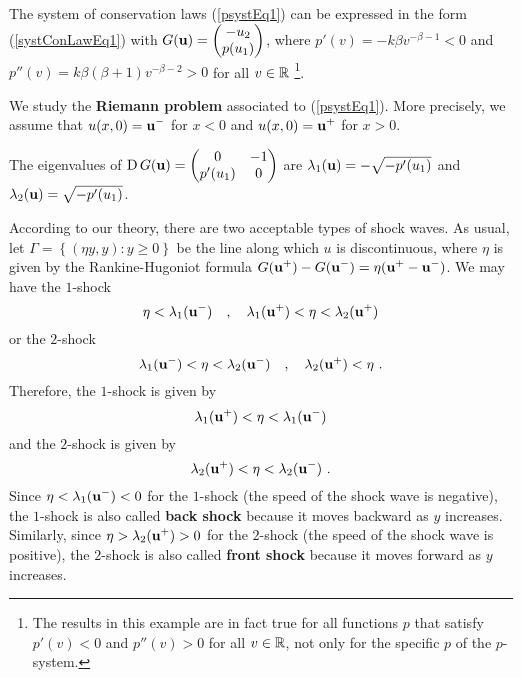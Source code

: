 \begin{egg}  \label{eggPsystem2}
The system of conservation laws (\ref{psystEq1}) can be expressed in
the form (\ref{systConLawEq1}) with
$\displaystyle G(\mathbf{u}) = \begin{pmatrix} -u_2 \\ p(u_1) \end{pmatrix}$,
where $p'(v) = -k\beta v^{-\beta-1} <0$ and
$p''(v) = k\beta(\beta+1) v^{-\beta-2} >0$ for all $v \in \mathbb{R}$
\footnote{The results in this example are in fact true for all
functions $p$ that satisfy $p'(v) < 0$ and $p''(v) > 0$ for all $v \in \mathbb{R}$,
not only for the specific $p$ of the $p$-system.}.

We study the {\bfseries Riemann problem} associated to (\ref{psystEq1}).  More
precisely, we assume that $\displaystyle u(x,0) = \mathbf{u}^-$ for $x<0$ and
$\displaystyle u(x,0) = \mathbf{u}^+$ for $x>0$.

The eigenvalues of
$\displaystyle \operatorname{D} G(\mathbf{u}) = \begin{pmatrix} 0 & -1 \\
p'(u_1) & 0 \end{pmatrix}$ are
$\lambda_1(\mathbf{u}) = -\sqrt{-p'(u_1)}$ and
$\lambda_2(\mathbf{u}) = \sqrt{-p'(u_1)}$.

According to our theory, there are two acceptable types of shock
waves.  As usual, let
$\displaystyle \Gamma = \left\{ (\eta y,y) : y \geq 0 \right\}$
be the line along which $u$ is discontinuous, where $\eta$ is given
by the Rankine-Hugoniot formula
$\displaystyle G(\mathbf{u}^+) - G(\mathbf{u}^-)
= \eta (\mathbf{u}^+ - \mathbf{u}^-)$.  We may have the $1$-shock
\[
\eta < \lambda_1(\mathbf{u}^-) \quad , \quad
\lambda_1(\mathbf{u}^+) <  \eta < \lambda_2(\mathbf{u}^+)
\]
or the $2$-shock
\[
\lambda_1(\mathbf{u}^-) <  \eta < \lambda_2(\mathbf{u}^-)
\quad , \quad \lambda_2(\mathbf{u}^+) <  \eta \ .
\]
Therefore, the $1$-shock is given by
\begin{equation} \label{psystEq2}
\lambda_1(\mathbf{u}^+) < \eta < \lambda_1(\mathbf{u}^-)
\end{equation}
and the $2$-shock is given by
\begin{equation} \label{psystEq3}
\lambda_2(\mathbf{u}^+) < \eta < \lambda_2(\mathbf{u}^-) \ .
\end{equation}
Since $\displaystyle \eta < \lambda_1(\mathbf{u}^-) < 0$ for the $1$-shock
(the speed of the shock wave is negative), the $1$-shock is also called
{\bfseries back shock}
because it moves backward as $y$ increases.
Similarly, since $\displaystyle \eta > \lambda_2(\mathbf{u}^+) > 0$ for the
$2$-shock (the speed of the shock wave is positive),
the $2$-shock is also called
{\bfseries front shock}
because it moves forward as $y$ increases.


\end{egg}
